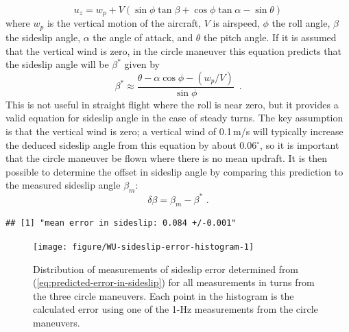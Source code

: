 \documentclass[12pt,twoside,english]{article}\usepackage[]{graphicx}\usepackage[]{color}
\makeatletter
\newenvironment{kframe}{%
 \def\at@end@of@kframe{}%
 \ifinner\ifhmode%
  \def\at@end@of@kframe{\end{minipage}}%
  \begin{minipage}{\columnwidth}%
 \fi\fi%
 \def\FrameCommand##1{\hskip\@totalleftmargin \hskip-\fboxsep
 \colorbox{shadecolor}{##1}\hskip-\fboxsep
     \hskip-\linewidth \hskip-\@totalleftmargin \hskip\columnwidth}%
 \MakeFramed {\advance\hsize-\width
   \@totalleftmargin\z@ \linewidth\hsize
   \@setminipage}}%
 {\par\unskip\endMakeFramed%
 \at@end@of@kframe}
\newenvironment{knitrout}{}{} %
\makeatother
\begin{document}
\begin{equation}
u_{z}=w_{p}+V(\sin\phi\tan\beta+\cos\phi\tan\alpha-\sin\theta)\label{eq:vwind-eq-for-SS} 
\end{equation}
where $w_{p}$ is the vertical motion of the aircraft, $V$ is airspeed, $\phi$ the roll angle, $\beta$ the sideslip angle, $\alpha$ the angle of attack, and $\theta$ the pitch angle. If it is assumed that the vertical wind is zero, in the circle maneuver this equation predicts that the sideslip angle will be $\beta^{*}$ given by\\ 
\begin{equation}
\beta^{*}\approx\frac{\theta-\alpha\cos\phi-(w_{p}/V)}{\sin\phi}\,\,\,.\label{eq:beta-from-other-measurements} 
\end{equation}
This is not useful in straight flight where the roll is near zero, but it provides a valid equation for sideslip angle in the case of steady turns. The key assumption is that the vertical wind is zero; a vertical wind of 0.1\,m/s will typically increase the deduced sideslip angle from this equation by about 0.06$^{\circ}$, so it is important that the circle maneuver be flown where there is no mean updraft. It is then possible to determine the offset in sideslip angle by comparing this prediction to the measured sideslip angle $\beta_{m}$:\\ 
\begin{equation}
\delta\beta=\beta_{m}-\beta^{*}\,\,.\label{eq:predicted-error-in-sideslip} 
\end{equation}

\begin{knitrout}\footnotesize
{}\color{fgcolor}\begin{kframe}
\begin{verbatim}
## [1] "mean error in sideslip: 0.084 +/-0.001"
\end{verbatim}
\end{kframe}\begin{figure}

{\centering \texttt{[image: figure/WU-sideslip-error-histogram-1]} 

}

\caption[Distribution of measurements of sideslip error determined from (\ref{eq:predicted-error-in-sideslip}) for all measurements in turns from the three circle maneuvers.]{Distribution of measurements of sideslip error determined from (\ref{eq:predicted-error-in-sideslip}) for all measurements in turns from the three circle maneuvers. Each point in the histogram is the calculated error using one of the 1-Hz measurements from the circle maneuvers.}\label{fig:sideslip-error-histogram}
\end{figure}


\end{knitrout}
\end{document}

